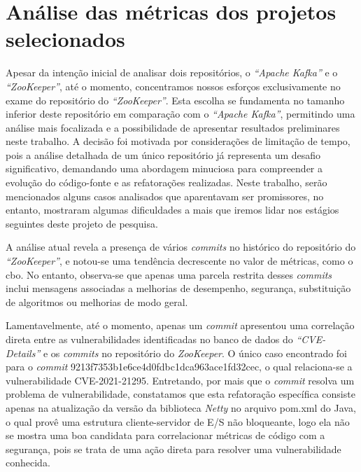 \section{Análise das métricas dos projetos selecionados}
Apesar da intenção inicial de analisar dois repositórios, o \textit{``Apache Kafka''} e o \textit{``ZooKeeper''}, até o momento, concentramos nossos esforços exclusivamente no exame do repositório do \textit{``ZooKeeper''}. Esta escolha se fundamenta no tamanho inferior deste repositório em comparação com o \textit{``Apache Kafka''}, permitindo uma análise mais focalizada e a possibilidade de apresentar resultados preliminares neste trabalho. A decisão foi motivada por considerações de limitação de tempo, pois a análise detalhada de um único repositório já representa um desafio significativo, demandando uma abordagem minuciosa para compreender a evolução do código-fonte e as refatorações realizadas.  Neste trabalho, serão mencionados alguns casos analisados que aparentavam ser promissores, no entanto, mostraram algumas dificuldades a mais que iremos lidar nos estágios seguintes deste projeto de pesquisa.

A análise atual revela a presença de vários \textit{commits} no histórico do repositório do \textit{``ZooKeeper''}, e notou-se uma tendência decrescente no valor de métricas, como o \gls{cbo}. No entanto, observa-se que apenas uma parcela restrita desses \textit{commits} inclui mensagens associadas a melhorias de desempenho, segurança, substituição de algoritmos ou melhorias de modo geral. 

Lamentavelmente, até o momento, apenas um \textit{commit} apresentou uma correlação direta entre as vulnerabilidades identificadas no banco de dados do \textit{``CVE-Details''} e os \textit{commits} no repositório do \textit{ZooKeeper}. O único caso encontrado foi para o \textit{commit} 9213f7353b1e6ce4d0fdbc1dca963ace1fd32cec, o qual relaciona-se a vulnerabilidade CVE-2021-21295. Entretando, por mais que o \textit{commit} resolva um problema de vulnerabilidade, constatamos que esta refatoração específica consiste apenas na atualização da versão da biblioteca \textit{Netty} no arquivo pom.xml do Java, o qual provê uma estrutura cliente-servidor de E/S não bloqueante, logo ela não se mostra uma boa candidata para correlacionar métricas de código com a segurança, pois se trata de uma ação direta para resolver uma vulnerabilidade conhecida.

